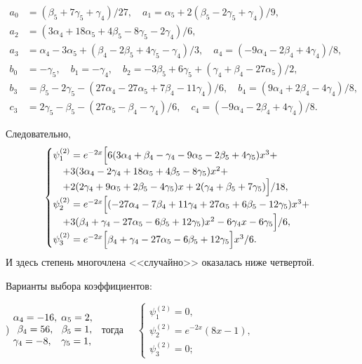 \documentclass[11pt]{article}
\begin{document}
{\begin{align*}
a_0 &= (\beta_5 + 7\gamma_5 + \gamma_4)/27, \quad a_1 = \alpha_5 + 2(\beta_5 - 2\gamma_5 + \gamma_4)/9, \\a_2 &= (3\alpha_4 + 18\alpha_5 + 4\beta_5 - 8\gamma_5 - 2\gamma_4)/6, \\
a_3 &= \alpha_4 - 3\alpha_5 + (\beta_4 - 2\beta_5 + 4\gamma_5 - \gamma_4)/3, \quad a_4 = (-9\alpha_4-2\beta_4+4\gamma_4)/8, \\[3pt]
b_0 &= -\gamma_5, \quad b_1 = -\gamma_4, \quad b_2 = - 3\beta_5 + 6\gamma_5 + (\gamma_4 + \beta_4 - 27\alpha_5)/2,\\
b_3 &= \beta_5 - 2\gamma_5 -(27\alpha_4 - 27\alpha_5 + 7\beta_4 - 11\gamma_4)/6, \quad b_4 = (9\alpha_4 + 2\beta_4 - 4\gamma_4)/8, \\[3pt]
c_3 &= 2\gamma_5 - \beta_5 -(27\alpha_5 - \beta_4 - \gamma_4)/6, \quad c_4 = (-9\alpha_4-2\beta_4+4\gamma_4)/8.
\end{align*}

Следовательно,
\begin{equation*}
\begin{cases}
\psi_1^{(2)} = e^{-2x} \Bigl[ 
6(3\alpha_4 + \beta_4 - \gamma_4 - 9 \alpha_5 - 2\beta_5 + 4\gamma_5) x^3 + \\
\quad + 3( 3\alpha_4 - 2\gamma_4 + 18 \alpha_5 + 4\beta_5 - 8\gamma_5) x^2 + \\
\quad + 2( 2\gamma_4 + 9\alpha_5 + 2\beta_5 - 4\gamma_5 ) x + 2(\gamma_4 + \beta_5 + 7\gamma_5) \Bigl]/18, \\
\psi_2^{(2)} = e^{-2x} \Bigl[ 
(-27\alpha_4 -7\beta_4 + 11\gamma_4 + 27\alpha_5 + 6\beta_5 - 12\gamma_5) x^3 + \\
\quad + 3( \beta_4 + \gamma_4 - 27\alpha_5 -6\beta_5 + 12\gamma_5 ) x^2 - 6\gamma_4 x - 6\gamma_5 \Bigl]/6, \\
\psi_3^{(2)} = e^{-2x} \Bigl[ 
\beta_4 + \gamma_4 - 27\alpha_5 - 6\beta_5 + 12\gamma_5 \Bigl] x^3 /6.
\end{cases}
\end{equation*}
И здесь степень многочлена <<случайно>> оказалась ниже четвертой.

Варианты выбора коэффициентов:

) $\begin{matrix} \alpha_4 = -16,\hfill\\ \beta_4 = 56,\\ \gamma_4 = -8,\hfill \end{matrix}$
$\begin{matrix} \alpha_5 = 2,\hfill\\ \beta_5 = 1,\\ \gamma_5 = 1,\hfill \end{matrix}$ \ 
тогда \ \ $\begin{cases} 
\psi_1^{(2)} = 0, \\
\psi_2^{(2)} = e^{-2x} (8x - 1), \\
\psi_3^{(2)} = 0;
\end{cases}$

}
\end{document}

